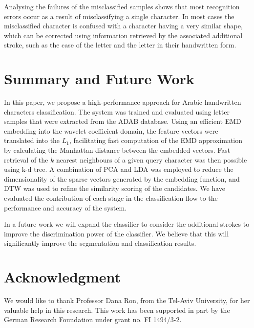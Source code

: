 \documentclass[10pt, conference, compsocconf]{IEEEtran}
\begin{document}
Analysing the failures of the misclassified samples shows that most recognition errors occur as a result of misclassifying a single character. 
In most cases the misclassified character is confused with a character having a very similar shape, which can be corrected using information retrieved by the associated additional stroke, such as the case of the letter  and the letter  in their handwritten form.

\section{Summary and Future Work}
\label{sec:summary_future_work}

In this paper, we propose a high-performance approach for Arabic handwritten characters classification.
The system was trained and evaluated using letter samples that were extracted from the ADAB database.
Using an efficient EMD embedding into the wavelet coefficient domain, the feature vectors were translated into the $L_1$, facilitating fast computation of the EMD approximation by calculating the Manhattan distance between the embedded vectors.
Fast retrieval of the $k$ nearest neighbours of a given query character was then possible using k-d tree.
A combination of PCA and LDA was employed to reduce the dimensionality of the sparse vectors generated by the embedding function, and DTW was used to refine the similarity scoring of the candidates.
We have evaluated the contribution of each stage in the classification flow to the performance and accuracy of the system.

In a future work we will expand the classifier to consider the additional strokes to improve the discrimination power of the classifier. 
We believe that this will significantly improve the segmentation and classification results.

\section*{Acknowledgment}
We would like to thank Professor Dana Ron, from the Tel-Aviv University, for her valuable help in this research. 
This work has been supported in part by the German Research Foundation under grant no. FI 1494/3-2.




\end{document}
